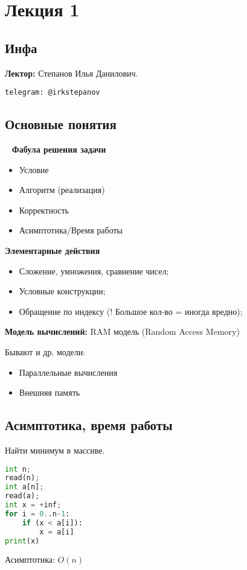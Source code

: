 \section{Лекция 1}

\subsection{Инфа}
\textbf{Лектор:} Степанов Илья Данилович.

\begin{verbatim}
telegram: @irkstepanov
\end{verbatim}

\subsection{Основные понятия}
~\newline
\textbf{Фабула решения задачи}
\begin{itemize}
    \item Условие
    \item Алгоритм (реализация)
    \item Корректность
    \item Асимптотика/Время работы
\end{itemize}

\textbf{Элементарные действия}
\begin{itemize}
    \item Сложение, умножения, сравнение чисел;
    \item Условные конструкции;
    \item Обращение по индексу (! Большое кол-во = иногда вредно);
\end{itemize}

\textbf{Модель вычислений:} RAM модель (Random Access Memory)

\begin{note}
Бывают и др. модели:
\begin{itemize}
    \item Параллельные вычисления
    \item Внешняя память
\end{itemize}

\end{note}

\subsection{Асимптотика, время работы}

\begin{example}
Найти минимум в массиве.
\lstset{style=mystyle}
\begin{lstlisting}[language=Python, caption=Нахождение минимума]
int n;
read(n);
int a[n];
read(a);
int x = +inf;
for i = 0..n-1:
    if (x < a[i]):
        x = a[i]
print(x)
\end{lstlisting}
Асимптотика: $O(n)$
\end{example}

